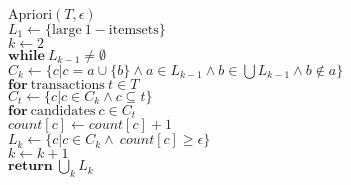 \indent \begin{math}\mathrm{Apriori}(T,\epsilon)\end{math}\\
\indent\indent \begin{math}L_1 \gets \{ \mathrm{large~1-itemsets} \} \end{math}\\
\indent\indent \begin{math}k \gets 2\end{math}\\
\indent\indent\indent \begin{math}\mathrm{\textbf{while}}~ L_{k-1} \neq \emptyset \end{math}\\
\indent\indent\indent\indent \begin{math}C_k \gets \{ c |c = a \cup \{b\}  \land  a \in L_{k-1} \land b \in \bigcup L_{k-1} \land b \not \in  a  \}\end{math}\\
\indent\indent\indent\indent \begin{math}\mathrm{\textbf{for}~transactions}~t \in T\end{math}\\
\indent\indent\indent\indent\indent \begin{math}C_t \gets \{ c | c \in C_k \land c \subseteq t \} \end{math}\\
\indent\indent\indent\indent\indent \begin{math}\mathrm{\textbf{for}~candidates}~c \in C_t\end{math}\\
\indent\indent\indent\indent\indent\indent \begin{math}count[c] \gets count[c]+1\end{math}\\
\indent\indent\indent\indent \begin{math}L_k \gets \{ c |c \in C_k \land ~ count[c] \geq \epsilon \}\end{math}\\
\indent\indent\indent\indent \begin{math}k \gets k+1\end{math}\\
\indent\indent\indent \begin{math}\mathrm{\textbf{return}}~\bigcup_k L_k\end{math}\\
